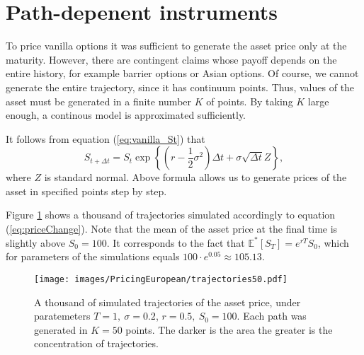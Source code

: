 \documentclass[a4paper,11pt, twoside]{book}
\theoremstyle{definition}
\theoremstyle{remark}
\def\Em{{\mathbb{E}^*}}
\begin{document}
\section{Path-depenent instruments}
\label{sec:pricing_complicated}

To price vanilla options it was sufficient to generate the asset price only at the maturity. However, there are contingent claims whose payoff depends on the entire history, for example barrier options or Asian options. Of course, we cannot generate the entire trajectory, since it has continuum points. Thus, values of the asset must be generated in a finite number $K$ of points. By taking $K$ large enough, a continous model is approximated sufficiently.

It follows from equation (\ref{eq:vanilla_St}) that
\begin{equation}
 \label{eq:priceChange}
 S_{t + {\Delta} t} = S_t \exp\left\{ (r - \frac{1}{2}\sigma^2)\Delta t + \sigma \sqrt{\Delta t} Z \right\},
\end{equation}
where $Z$ is standard normal. Above formula allows us to generate prices of the asset in specified points step by step.

Figure \ref{fig:trajectories} shows a thousand of trajectories simulated accordingly to equation (\ref{eq:priceChange}). Note that the mean of the asset price at the final time is slightly above $S_0 = 100$. It corresponds to the fact that $\Em [S_T] = e^{rT}S_0$, which for parameters of the simulations equals $100\cdot e^{0.05} \approx 105.13$.

\begin{figure}[ht]
\centering
 \texttt{[image: images/PricingEuropean/trajectories50.pdf]}
\caption{A thousand of simulated trajectories of the asset price, under paratemeters ${T=1},\ {\sigma=0.2}$, ${r=0.5},\ {S_0=100}$. Each path was generated in $K=50$ points. The darker is the area the greater is the concentration of trajectories.}
\label{fig:trajectories}
\end{figure}
\end{document}
